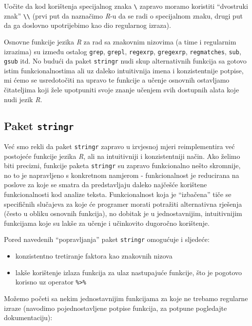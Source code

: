 \documentclass[]{book}
\providecommand{\tightlist}{%
  \setlength{\itemsep}{0pt}\setlength{\parskip}{0pt}}
\theoremstyle{definition}
\theoremstyle{definition}
\theoremstyle{definition}
\theoremstyle{remark}
\begin{document}
Uočite da kod korištenja specijalnog znaka \texttt{\textbackslash{}}
zapravo moramo koristiti ``dvostruki znak''
\texttt{\textbackslash{}\textbackslash{}} (prvi put da naznačimo
\emph{R}-u da se radi o specijalnom znaku, drugi put da ga doslovno
upotrijebimo kao dio regularnog izraza).

Osnovne funkcije jezika \emph{R} za rad sa znakovnim nizovima (a time i
regularnim izrazima) su između ostalog \texttt{grep}, \texttt{grepl},
\texttt{regexrp}, \texttt{gregexrp}, \texttt{regmatches}, \texttt{sub},
\texttt{gsub} itd. No budući da paket \texttt{stringr} nudi skup
alternativnih funkcija sa gotovo istim funkcionalnostima ali uz daleko
intuitivnija imena i konzistentnije potpise, mi ćemo se usredotočiti na
upravo te funkcije a učenje osnovnih ostavljamo čitateljima koji žele
upotpuniti svoje znanje učenjem svih dostupnih alata koje nudi jezik
\emph{R}.

\subsection{\texorpdfstring{Paket
\texttt{stringr}}{Paket stringr}}\label{paket-stringr}

Već smo rekli da paket \texttt{stringr} zapravo u izvjesnoj mjeri
reimplementira već postojeće funkcije jezika \emph{R}, ali na
intuitivniji i konzistentniji način. Ako želimo biti precizni, funkcije
paketa \texttt{stringr} su zapravo funkcionalno nešto skromnije, no to
je napravljeno s konkretnom namjerom - funkcionalnost je reducirana na
poslove za koje se smatra da predstavljaju daleko najčešće korištene
funkcionalnosti kod analize teksta. Funkcionalnost koja je ``izbačena''
tiče se specifičnih slučajeva za koje će programer morati potražiti
alternativna rješenja (često u obliku osnovnih funkcija), no dobitak je
u jednostavnijim, intuitivnijim funkcijama koje su lakše za učenje i
učinkovito dugoročno korištenje.

Pored navedenih ``popravljanja'' paket \texttt{stringr} omogućuje i
sljedeće:

\begin{itemize}
\tightlist
\item
  konzistentno tretiranje faktora kao znakovnih nizova
\item
  lakše korištenje izlaza funkcija za ulaz nastupajuće funkcije, što je
  pogotovo korisno uz operator \texttt{\%\textgreater{}\%}
\end{itemize}

Možemo početi sa nekim jednostavnijim funkcijama za koje ne trebamo
regularne izraze (navodimo pojednostavljene potpise funkcija, za potpune
pogledajte dokumentaciju):
\end{document}
